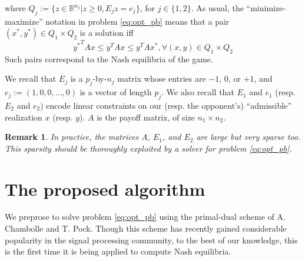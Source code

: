 \documentclass[a4paper,9pt,journal]{IEEEtran}
\newtheorem{remark}{Remark}
\begin{document}
where $Q_j := \{z \in \mathbb{R}^{n_j}|z \ge 0, E_jz=e_j\}$, for $j \in \{1, 2\}$. As usual, the ``minimize-maximize'' notation in problem
\eqref{eq:opt_pb} means that a pair $(x^*, y^*) \in Q_1 \times Q_2$ is a solution iff
\begin{equation}
  {y^*}^TAx \le y^TAx \le y^TAx^*, \forall (x, y) \in Q_1 \times Q_2
\end{equation}
Such pairs correspond to the Nash equilibria of the game.

We recall that $E_j$ is a $p_j$-by-$n_j$ matrix whose
entries are $-1$, $0$, or $+1$, and $e_j := (1, 0, 0, ..., 0)$ is a vector of length $p_j$. We also recall that $E_1$ and $e_1$ (resp. $E_2$ and $e_2$)
encode linear constraints on our (resp. the opponent's)  ``admissible'' realization $x$ (resp. $y$). $A$ is the payoff matrix, of size $n_1 \times n_2$.


\begin{remark}
  In practice, the matrices $A$, $E_1$, and $E_2$ are large but very sparse too.
This sparsity should be thoroughly exploited by a solver for problem \eqref{eq:opt_pb}.
\end{remark}




\section{The proposed algorithm}
We preprose to solve problem \eqref{eq:opt_pb} using the primal-dual scheme of A. Chambolle and T. Pock.
Though this scheme has recently gained considerable popularity in the signal processing community, to the best of our knowledge,
this is the first time it is being applied to compute Nash equilibria.
\end{document}

